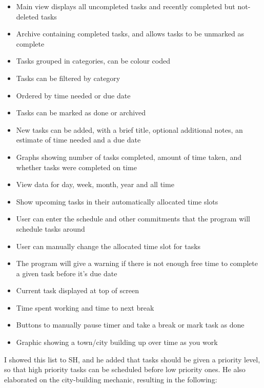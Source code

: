 \documentclass{article}
\begin{document}
\begin{itemize}
\item Main view displays all uncompleted tasks and recently completed but
  not-deleted tasks
\item Archive containing completed tasks, and allows tasks to be unmarked as
  complete
\item Tasks grouped in categories, can be colour coded
\item Tasks can be filtered by category
\item Ordered by time needed or due date
\item Tasks can be marked as done or archived
\item New tasks can be added, with a brief title, optional additional notes, an
  estimate of time needed and a due date
\item Graphs showing number of tasks completed, amount of time taken, and
  whether tasks were completed on time
\item View data for day, week, month, year and all time
\item Show upcoming tasks in their automatically allocated time slots
\item User can enter the schedule and other commitments that the program will
  schedule tasks around
\item User can manually change the allocated time slot for tasks
\item The program will give a warning if there is not enough free time to
  complete a given task before it's due date
\item Current task displayed at top of screen
\item Time spent working and time to next break
\item Buttons to manually pause timer and take a break or mark task as done
\item Graphic showing a town/city building up over time as you work
\end{itemize}

I showed this list to SH, and he added that tasks should be given a priority
level, so that high priority tasks can be scheduled before low priority ones. He
also elaborated on the city-building mechanic, resulting in the following:
\end{document}

